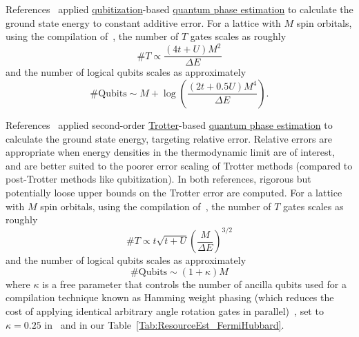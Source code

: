 \begin{refsection}
References~\cite{babbush2018EncodingElectronicSpectraLinearT,yoshioka2022CondensedMatterSimulation} applied \hyperref[prim:Qubitization]{qubitization}-based \hyperref[prim:QPE]{quantum phase estimation} to calculate the ground state energy to constant additive error. For a lattice with $M$ spin orbitals, using the compilation of~\cite{babbush2018EncodingElectronicSpectraLinearT}, the number of $T$ gates scales as roughly~\cite[Eq.~(61)]{babbush2018EncodingElectronicSpectraLinearT}
\begin{equation}
    \# T \propto \frac{(4t + U)M^2}{\Delta E}
\end{equation}
and the number of logical qubits scales as approximately~\cite[Eq.~(62)]{babbush2018EncodingElectronicSpectraLinearT}
\begin{equation}
    \# \mathrm{Qubits} \sim M + \log\left( \frac{(2t + 0.5U)M^4}{\Delta E} \right).
\end{equation}


References~\cite{Kivlichan2020ImprovedFaultTolerantSimulationCondensedMatter,CampbellHubbard22} applied second-order \hyperref[prim:ProductFormulae]{Trotter}-based \hyperref[prim:QPE]{quantum phase estimation} to calculate the ground state energy, targeting relative error. Relative errors are appropriate when energy densities in the thermodynamic limit are of interest, and are better suited to the poorer error scaling of Trotter methods (compared to post-Trotter methods like qubitization). In both references, rigorous but potentially loose upper bounds on the Trotter error are computed. For a lattice with $M$ spin orbitals, using the compilation of~\cite{CampbellHubbard22}, the number of $T$ gates scales as roughly~\cite[Eqs.~(C3), (D6), (D10), (E17), (F10)]{CampbellHubbard22}
\begin{equation}
    \# T \propto t\sqrt{t+U} \left(\frac{M}{\Delta E}\right)^{3/2}
\end{equation}
and the number of logical qubits scales as approximately~\cite[Table II]{CampbellHubbard22}
\begin{equation}
    \# \mathrm{Qubits} \sim (1 + \kappa)M
\end{equation} 
where $\kappa$ is a free parameter that controls the number of ancilla qubits used for a compilation technique known as Hamming weight phasing (which reduces the cost of applying identical arbitrary angle rotation gates in parallel)~\cite{gidney2018_halving_addition,Kivlichan2020ImprovedFaultTolerantSimulationCondensedMatter}, set to $\kappa=0.25$ in~\cite{CampbellHubbard22} and in our Table~\ref{Tab:ResourceEst_FermiHubbard}.



\end{refsection}
